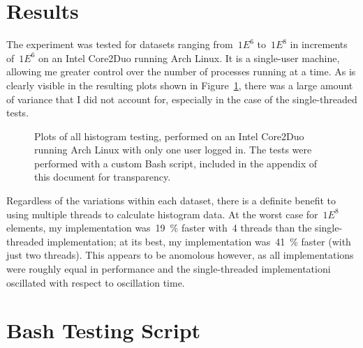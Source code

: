 \documentclass{article}
\begin{document}
\section{Results}
The experiment was tested for datasets ranging from~$1E^6$ to~$1E^8$ in
increments of~$1E^6$ on an Intel Core2Duo running Arch Linux.  It is a
single-user machine, allowing me greater control over the number of processes
running at a time.  As is clearly visible in the resulting plots shown in
Figure~\ref{fig:thePlots}, there was a large amount of variance that I did not
account for, especially in the case of the single-threaded tests.
%
\begin{figure}[H]
	\centering
	\subfloat{}
	\subfloat{}

	\subfloat{}
	\subfloat{}

	\parbox{.8\textwidth}{
	\caption{Plots of all histogram testing, performed on an Intel Core2Duo
	running Arch Linux with only one user logged in. The tests were performed
	with a custom Bash script, included in the appendix of this document for
	transparency.}
	\label{fig:thePlots}}
\end{figure}
%
Regardless of the variations within each dataset, there is a definite benefit
to using multiple threads to calculate histogram data.  At the worst case
for~$1E^8$ elements, my implementation was~\SI{19}{\percent} faster with~4
threads than the single-threaded implementation;  at its best, my
implementation was~\SI{41}{\percent} faster (with just two threads).  This
appears to be anomolous however, as all implementations were roughly equal in
performance and the single-threaded implementationi oscillated with respect to
oscillation time.

\appendix
\section{Bash Testing Script}
	\begin{center}
	\parbox{.6\textwidth}{
	}
	\end{center}
\end{document}
